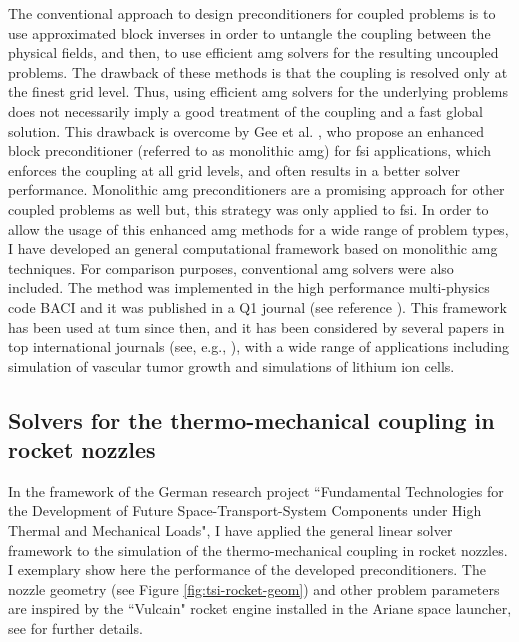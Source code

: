 \documentclass{article}
\newcommand{\bemph}[1]{#1}
\begin{document}
The conventional approach to design preconditioners for coupled problems is to use approximated block inverses in order to untangle the coupling between the physical fields, and then, to use efficient \ac{amg} solvers for the resulting uncoupled problems. The drawback of these methods is that the coupling is resolved only at the finest grid level. Thus, using efficient \ac{amg} solvers for the underlying problems does not necessarily imply a good treatment of the coupling and a fast global solution. This drawback is overcome by Gee et al. \cite{Gee2011}, who propose an enhanced block preconditioner (referred to as monolithic \ac{amg}) for \ac{fsi} applications, which enforces the coupling at all grid levels, and often results in a better solver performance. Monolithic \ac{amg} preconditioners are a promising approach for other coupled problems as well but, this strategy was only applied to \ac{fsi}. In order to allow the usage of this enhanced \ac{amg} methods for a wide range of problem types, \bemph{I have developed an general computational framework based on monolithic \ac{amg} techniques}. For comparison purposes, conventional \ac{amg} solvers were also included. The method was implemented in the high performance multi-physics code BACI \cite{Wall2014} and \bemph{it was published in a Q1 journal} (see reference \cite{verdugo_unified_2016}). This framework has been used at \ac{tum} since then, and \bemph{it has been considered by several papers in top international journals} (see, e.g., \cite{Kremheller2018,Fang2018}), with a wide range of applications including  simulation of vascular tumor growth and simulations of lithium ion cells.


%
%
%
%


\subsection{Solvers for the thermo-mechanical coupling in rocket nozzles}

In the framework of the \bemph{German research project} ``Fundamental Technologies for the Development of Future Space-Transport-System Components under High Thermal and Mechanical Loads", I have applied the general linear solver framework to the simulation of the thermo-mechanical coupling in rocket nozzles. I exemplary show here the performance of the developed preconditioners. The nozzle geometry  (see Figure \ref{fig:tsi-rocket-geom}) and other problem parameters are inspired by the ``Vulcain" rocket engine installed in the Ariane space launcher, see  \cite{verdugo_unified_2016} for further details.
\end{document}

